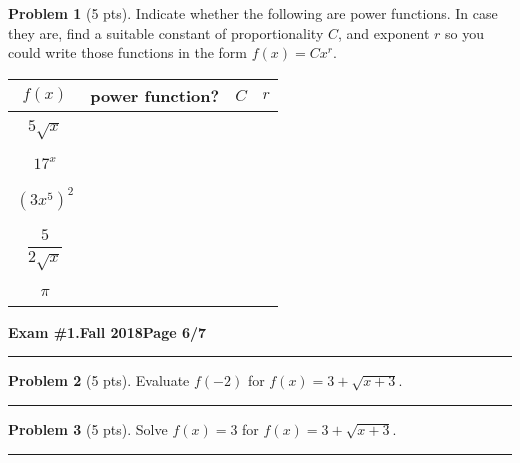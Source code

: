 \documentclass[12pt]{article}
\theoremstyle{definition}
\newtheorem{problem}{Problem}
\begin{document}
\begin{problem}[5 pts]
  Indicate whether the following are power functions. In case they are, find a suitable constant of proportionality $C$,
  and exponent $r$ so you could write those functions in the form $f(x) = Cx^r$. 
  \begin{center}
    \begin{tabular}{|c|c|c|c|}
      \hline
      $f(x)$ & power function? & $C$ & $r$ \\
      \hline
      \hline
             &&& \\
      $5\sqrt{x}$ &&\hspace{1cm} & \hspace{1cm} \\
             &&& \\
      \hline
             &&& \\
      $17^x$ &&& \\
             &&& \\
      \hline
             &&& \\
      $(3x^5)^2$ &&& \\
             &&& \\
      \hline
             &&& \\
      $\dfrac{5}{2\sqrt{x}}$ &&& \\
             &&& \\
      \hline
             &&& \\
      $\pi$ &&& \\
             &&& \\
      \hline
    \end{tabular}
  \end{center}
\end{problem}
\newpage


\hfill{\large\bf Exam \#1.}\hfill{\large\bf  Fall 2018}\hfill{\large\bf Page 6/7}\hrule

\bigskip
\begin{problem}[5 pts]
  Evaluate $f(-2)$ for $f(x) = 3+\sqrt{x+3}$.

  \vspace{2cm}
\end{problem}
\hrule

\begin{problem}[5 pts]
  Solve $f(x)=3$ for $f(x) = 3+\sqrt{x+3}$.

  \vspace{2cm}
\end{problem}
\hrule
\end{document}
